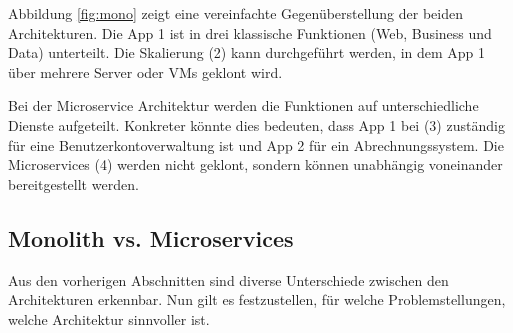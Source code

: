Abbildung \ref{fig:mono} zeigt eine vereinfachte Gegenüberstellung der beiden Architekturen. Die App 1 ist in drei klassische Funktionen (Web, Business und Data) unterteilt. Die Skalierung (2) kann durchgeführt werden, in dem App 1 über mehrere Server oder VMs geklont wird. 

Bei der Microservice Architektur werden die Funktionen auf unterschiedliche Dienste aufgeteilt. Konkreter könnte dies bedeuten, dass App 1 bei (3) zuständig für eine Benutzerkontoverwaltung ist und App 2 für ein Abrechnungssystem. Die Microservices (4) werden nicht geklont, sondern können unabhängig voneinander bereitgestellt werden. 

\subsection{Monolith vs. Microservices}\label{sec:monolith_vs_microservices}
Aus den vorherigen Abschnitten sind diverse Unterschiede zwischen den Architekturen erkennbar. Nun gilt es festzustellen, für welche Problemstellungen, welche Architektur sinnvoller ist. \cite{wolff2016mic_architectures} \cite{birk2016mic_soa}  


